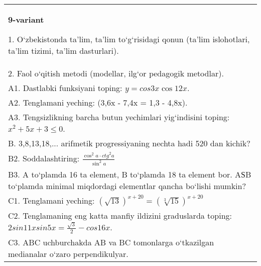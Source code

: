 \documentclass{article}
\begin{document}
\begin{tabular}{m{17cm}}
\textbf{9-variant}

1. O‘zbekistonda ta’lim, ta’lim to‘g‘risidagi qonun (ta’lim islohotlari, ta’lim tizimi, ta’lim dasturlari). \\
2. Faol o‘qitish metodi (modellar, ilg‘or pedagogik metodlar). \\
A1. Dastlabki funksiyani toping: \(y=cos{3x}\cos{12x}\). \\
A2. Tenglamani yeching: (3,6x - 7,4x = 1,3 - 4,8x). \\
A3. Tengsizlikning barcha butun yechimlari yig‘indisini toping: \(x^2 + 5x + 3 \leq 0\). \\
B. 3,8,13,18,... arifmetik progressiyaning nechta hadi 520 dan kichik? \\
B2. Soddalashtiring: \(\frac{\cos^{2}a \cdot {ctg}^{2}a}{\sin^{2}a}\) \\
B3. A to‘plamda 16 ta element, B to‘plamda 18 ta element bor. AЅB to‘plamda minimal miqdordagi elementlar qancha bo‘lishi mumkin? \\
C1. Tenglamani yeching: \((\sqrt{13}) ^{x + 20} = (\sqrt[3]{15}) ^{x + 20}\) \\
C2. Tenglamaning eng katta manfiy ildizini graduslarda toping: \(2sin11xsin5x = \frac{\sqrt{3}}{2} - cos16x\). \\
C3. ABC uchburchakda AB va BC tomonlarga o‘tkazilgan medianalar o‘zaro perpendikulyar. \\

\end{tabular}
\vspace{1cm}
\end{document}

